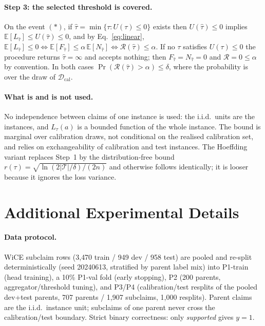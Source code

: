 \documentclass{article}
\begin{document}
\paragraph{Step 3: the selected threshold is covered.}
On the event $(\ast)$, if $\hat\tau=\min\{\tau:U(\tau)\le0\}$ exists then
$U(\hat\tau)\le0$ implies $\mathbb{E}[L_{\hat\tau}]\le U(\hat\tau)\le0$,
and by Eq.~\eqref{eq:linear},
$\mathbb{E}[L_{\hat\tau}]\le0\iff\mathbb{E}[F_{\hat\tau}]
\le\alpha\,\mathbb{E}[N_{\hat\tau}]\iff\mathcal{R}(\hat\tau)\le\alpha$.
If no $\tau$ satisfies $U(\tau)\le0$ the procedure returns
$\hat\tau=\infty$ and accepts nothing; then $F_{\hat\tau}=N_{\hat\tau}=0$
and $\mathcal{R}=0\le\alpha$ by convention. In both cases
$\Pr(\mathcal{R}(\hat\tau)>\alpha)\le\delta$, where the probability is
over the draw of $\mathcal{D}_{\mathrm{cal}}$.

\paragraph{What is and is not used.}
No independence between claims of one instance is used: the i.i.d.\
units are the instances, and $L_\tau(a)$ is a bounded function of the
whole instance. The bound is marginal over calibration draws, not
conditional on the realised calibration set, and relies on
exchangeability of calibration and test instances. The Hoeffding variant
replaces Step~1 by the distribution-free bound
$r(\tau)=\sqrt{\ln(2|\mathcal{T}|/\delta)/(2n)}$ and otherwise follows
identically; it is looser because it ignores the loss variance.

\section{Additional Experimental Details}
\label{app:details}

\paragraph{Data protocol.}
WiCE subclaim rows (3{,}470 train / 949 dev / 958 test) are pooled and
re-split deterministically (seed 20240613, stratified by parent label
mix) into P1-train (head training), a 10\% P1-val fold (early
stopping), P2 (200 parents, aggregator/threshold tuning), and
P3/P4 (calibration/test resplits of the pooled dev+test parents,
707 parents / 1{,}907 subclaims, 1{,}000 resplits). Parent claims are
the i.i.d.\ instance unit; subclaims of one parent never cross the
calibration/test boundary. Strict binary correctness: only
\emph{supported} gives $y{=}1$.
\end{document}
